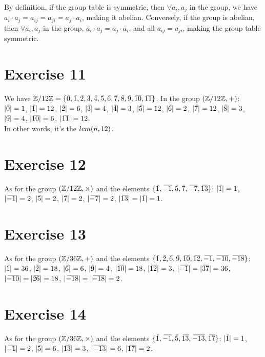 \documentclass[12pt]{article}
\begin{document}
    By definition, if the group table is symmetric,
    then $\forall a_i, a_j$ in the group,
    we have $a_i \cdot a_j = a_{ij} = a_{ji} = a_j \cdot a_i$,
    making it abelian.
    Conversely, if the group is abelian,
    then $\forall a_i, a_j$ in the group, $a_i \cdot a_j = a_j \cdot a_i$,
    and all $a_{ij} = a_{ji}$,
    making the group table symmetric.


    \section*{Exercise 11}
    We have $\zbb/12\zbb = \{\olsi{0},\olsi{1}, \olsi{2}, \olsi{3}, \olsi{4},
    \olsi{5}, \olsi{6}, \olsi{7}, \olsi{8}, \olsi{9}, \olsi{10}, \olsi{11}\}$.
    In the group $(\mathbb{Z}/12\mathbb{Z}, +)$:
    $|\,\overline{\!{0}}| = 1$,
    $|\,\overline{\!{1}}| = 12$,
    $|\,\overline{\!{2}}| = 6$,
    $|\,\overline{\!{3}}| = 4$,
    $|\,\overline{\!{4}}| = 3$, 
    $|\,\overline{\!{5}}| = 12$,
    $|\,\overline{\!{6}}| = 2$,
    $|\,\overline{\!{7}}| = 12$,
    $|\,\overline{\!{8}}| = 3$,
    $|\,\overline{\!{9}}| = 4$, 
    $|\,\overline{\!{10}}| = 6$,
    $|\,\overline{\!{11}}| = 12$. \\
    In other words, it's the $lcm(\,\overline{\!{n}}, 12)$.


    \section*{Exercise 12}
    As for the group $(\mathbb{Z}/12\mathbb{Z}, \times)$
    and the elements $\{\,\overline{\!{1}}, \,\overline{\!{-1}}, \,\overline{\!{5}}, \,\overline{\!{7}}, \,\overline{\!{-7}},
    \,\overline{\!{13}}\}$:
    $|\,\overline{\!{1}}| = 1$,
    $|\,\overline{\!{-1}}| = 2$,
    $|\,\overline{\!{5}}| = 2$,
    $|\,\overline{\!{7}}| = 2$,
    $|\,\overline{\!{-7}}| = 2$, 
    $|\,\overline{\!{13}}| = |\,\overline{\!{1}}| = 1$.


    \section*{Exercise 13}
    As for the group $(\mathbb{Z}/36\mathbb{Z}, +)$
    and the elements $\{\olsi{1}, \olsi{2}, \olsi{6}, \olsi{9}, \olsi{10},
    \olsi{12}, \olsi{-1}, \olsi{-10}, \olsi{-18}\}$:
    $|\,\overline{\!{1}}| = 36$,
    $|\,\overline{\!{2}}| = 18$,
    $|\,\overline{\!{6}}| = 6$,
    $|\,\overline{\!{9}}| = 4$,
    $|\,\overline{\!{10}}| = 18$, 
    $|\,\overline{\!{12}}| = 3$,
    $|\,\overline{\!{-1}}| = |\,\overline{\!{37}}| = 36$,
    $|\,\overline{\!{-10}}| = |\,\overline{\!{26}}| = 18$,
    $|\,\overline{\!{-18}}| = |\,\overline{\!{-18}}| = 2$.



    \section*{Exercise 14}
    As for the group $(\mathbb{Z}/36\mathbb{Z}, \times)$
    and the elements $\{\,\overline{\!{1}}, \,\overline{\!{-1}}, \,\overline{\!{5}}, \,\overline{\!{13}}, \,\overline{\!{-13}},
    \,\overline{\!{17}}\}$:
    $|\,\overline{\!{1}}| = 1$,
    $|\,\overline{\!{-1}}| = 2$,
    $|\,\overline{\!{5}}| = 6$,
    $|\,\overline{\!{13}}| = 3$,
    $|\,\overline{\!{-13}}| = 6$, 
    $|\,\overline{\!{17}}| = 2$.
\end{document}

